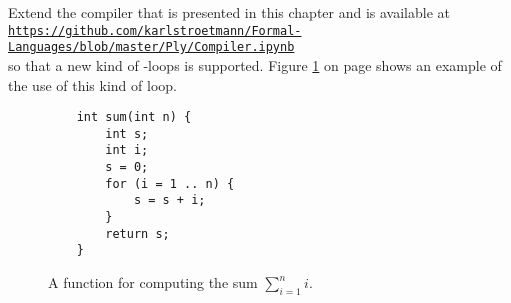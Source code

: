 \vspace*{\fill}
\pagebreak
\vspace*{\fill}
\pagebreak
\vspace*{\fill}
\pagebreak

\exerciseEng
Extend the compiler that is presented in this chapter and is available at
\\[0.2cm]
\hspace*{1.3cm}
\href{https://github.com/karlstroetmann/Formal-Languages/blob/master/Ply/Compiler.ipynb}{\texttt{https://github.com/karlstroetmann/Formal-Languages/blob/master/Ply/Compiler.ipynb}}
\\[0.2cm]
so that a new kind of -loops is supported.
Figure \ref{fig:MySum.c3} on page \pageref{fig:MySum.c3} shows an example of the use of this kind of
 loop. 
\eox

\begin{figure}[!ht]
\centering
\begin{verbatim}
    int sum(int n) {
        int s;
        int i;
        s = 0;
        for (i = 1 .. n) {
            s = s + i;
        }
        return s;
    }
\end{verbatim}
\vspace*{-0.3cm}
\caption{A function for computing the sum $\sum\limits_{i=1}^{n}i$.}
\label{fig:MySum.c3}
\end{figure}

